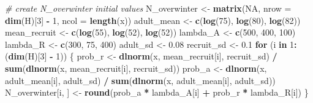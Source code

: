 \documentclass[
]{article}
\newenvironment{Shaded}{\begin{snugshade}}{\end{snugshade}}
\newcommand{\AttributeTok}[1]{\textcolor[rgb]{0.13,0.29,0.53}{#1}}
\newcommand{\CommentTok}[1]{\textcolor[rgb]{0.56,0.35,0.01}{\textit{#1}}}
\newcommand{\ConstantTok}[1]{\textcolor[rgb]{0.56,0.35,0.01}{#1}}
\newcommand{\ControlFlowTok}[1]{\textcolor[rgb]{0.13,0.29,0.53}{\textbf{#1}}}
\newcommand{\DecValTok}[1]{\textcolor[rgb]{0.00,0.00,0.81}{#1}}
\newcommand{\FloatTok}[1]{\textcolor[rgb]{0.00,0.00,0.81}{#1}}
\newcommand{\FunctionTok}[1]{\textcolor[rgb]{0.13,0.29,0.53}{\textbf{#1}}}
\newcommand{\NormalTok}[1]{#1}
\newcommand{\OtherTok}[1]{\textcolor[rgb]{0.56,0.35,0.01}{#1}}
\newcommand{\SpecialCharTok}[1]{\textcolor[rgb]{0.81,0.36,0.00}{\textbf{#1}}}
\begin{document}
\begin{Shaded}
\begin{Highlighting}[]
\CommentTok{\# create N\_overwinter initial values}
\NormalTok{N\_overwinter }\OtherTok{\textless{}{-}} \FunctionTok{matrix}\NormalTok{(}\ConstantTok{NA}\NormalTok{, }\AttributeTok{nrow =} \FunctionTok{dim}\NormalTok{(H)[}\DecValTok{3}\NormalTok{] }\SpecialCharTok{{-}} \DecValTok{1}\NormalTok{, }\AttributeTok{ncol =} \FunctionTok{length}\NormalTok{(x))}
\NormalTok{adult\_mean }\OtherTok{\textless{}{-}} \FunctionTok{c}\NormalTok{(}\FunctionTok{log}\NormalTok{(}\DecValTok{75}\NormalTok{), }\FunctionTok{log}\NormalTok{(}\DecValTok{80}\NormalTok{), }\FunctionTok{log}\NormalTok{(}\DecValTok{82}\NormalTok{))}
\NormalTok{mean\_recruit }\OtherTok{\textless{}{-}} \FunctionTok{c}\NormalTok{(}\FunctionTok{log}\NormalTok{(}\DecValTok{55}\NormalTok{), }\FunctionTok{log}\NormalTok{(}\DecValTok{52}\NormalTok{), }\FunctionTok{log}\NormalTok{(}\DecValTok{52}\NormalTok{))}
\NormalTok{lambda\_A }\OtherTok{\textless{}{-}} \FunctionTok{c}\NormalTok{(}\DecValTok{500}\NormalTok{, }\DecValTok{400}\NormalTok{, }\DecValTok{100}\NormalTok{)}
\NormalTok{lambda\_R }\OtherTok{\textless{}{-}} \FunctionTok{c}\NormalTok{(}\DecValTok{300}\NormalTok{, }\DecValTok{75}\NormalTok{, }\DecValTok{400}\NormalTok{)}
\NormalTok{adult\_sd }\OtherTok{\textless{}{-}} \FloatTok{0.08}
\NormalTok{recruit\_sd }\OtherTok{\textless{}{-}} \FloatTok{0.1}
\ControlFlowTok{for}\NormalTok{ (i }\ControlFlowTok{in} \DecValTok{1}\SpecialCharTok{:}\NormalTok{(}\FunctionTok{dim}\NormalTok{(H)[}\DecValTok{3}\NormalTok{] }\SpecialCharTok{{-}} \DecValTok{1}\NormalTok{)) \{}
\NormalTok{  prob\_r }\OtherTok{\textless{}{-}} \FunctionTok{dlnorm}\NormalTok{(x, mean\_recruit[i], recruit\_sd) }\SpecialCharTok{/}
    \FunctionTok{sum}\NormalTok{(}\FunctionTok{dlnorm}\NormalTok{(x, mean\_recruit[i], recruit\_sd))}
\NormalTok{  prob\_a }\OtherTok{\textless{}{-}} \FunctionTok{dlnorm}\NormalTok{(x, adult\_mean[i], adult\_sd) }\SpecialCharTok{/}
    \FunctionTok{sum}\NormalTok{(}\FunctionTok{dlnorm}\NormalTok{(x, adult\_mean[i], adult\_sd))}
\NormalTok{  N\_overwinter[i, ] }\OtherTok{\textless{}{-}} \FunctionTok{round}\NormalTok{(prob\_a }\SpecialCharTok{*}\NormalTok{ lambda\_A[i] }\SpecialCharTok{+}\NormalTok{ prob\_r }\SpecialCharTok{*}\NormalTok{ lambda\_R[i])}
\NormalTok{\}}


\end{Highlighting}
\end{Shaded}
\end{document}
